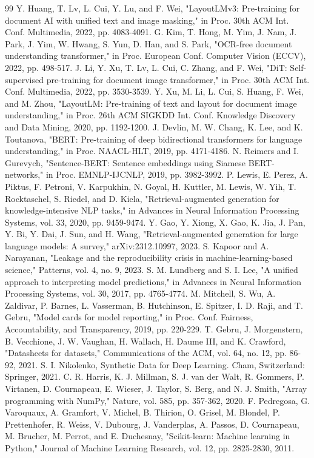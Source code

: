 \documentclass[conference]{IEEEtran}
\begin{document}
\begin{thebibliography}{99}
 Y. Huang, T. Lv, L. Cui, Y. Lu, and F. Wei, "LayoutLMv3: Pre-training for document AI with unified text and image masking," in Proc. 30th ACM Int. Conf. Multimedia, 2022, pp. 4083-4091.
 G. Kim, T. Hong, M. Yim, J. Nam, J. Park, J. Yim, W. Hwang, S. Yun, D. Han, and S. Park, "OCR-free document understanding transformer," in Proc. European Conf. Computer Vision (ECCV), 2022, pp. 498-517.
 J. Li, Y. Xu, T. Lv, L. Cui, C. Zhang, and F. Wei, "DiT: Self-supervised pre-training for document image transformer," in Proc. 30th ACM Int. Conf. Multimedia, 2022, pp. 3530-3539.
 Y. Xu, M. Li, L. Cui, S. Huang, F. Wei, and M. Zhou, "LayoutLM: Pre-training of text and layout for document image understanding," in Proc. 26th ACM SIGKDD Int. Conf. Knowledge Discovery and Data Mining, 2020, pp. 1192-1200.
 J. Devlin, M. W. Chang, K. Lee, and K. Toutanova, "BERT: Pre-training of deep bidirectional transformers for language understanding," in Proc. NAACL-HLT, 2019, pp. 4171-4186.
 N. Reimers and I. Gurevych, "Sentence-BERT: Sentence embeddings using Siamese BERT-networks," in Proc. EMNLP-IJCNLP, 2019, pp. 3982-3992.
 P. Lewis, E. Perez, A. Piktus, F. Petroni, V. Karpukhin, N. Goyal, H. Kuttler, M. Lewis, W. Yih, T. Rocktaschel, S. Riedel, and D. Kiela, "Retrieval-augmented generation for knowledge-intensive NLP tasks," in Advances in Neural Information Processing Systems, vol. 33, 2020, pp. 9459-9474.
 Y. Gao, Y. Xiong, X. Gao, K. Jia, J. Pan, Y. Bi, Y. Dai, J. Sun, and H. Wang, "Retrieval-augmented generation for large language models: A survey," arXiv:2312.10997, 2023.
 S. Kapoor and A. Narayanan, "Leakage and the reproducibility crisis in machine-learning-based science," Patterns, vol. 4, no. 9, 2023.
 S. M. Lundberg and S. I. Lee, "A unified approach to interpreting model predictions," in Advances in Neural Information Processing Systems, vol. 30, 2017, pp. 4765-4774.
 M. Mitchell, S. Wu, A. Zaldivar, P. Barnes, L. Vasserman, B. Hutchinson, E. Spitzer, I. D. Raji, and T. Gebru, "Model cards for model reporting," in Proc. Conf. Fairness, Accountability, and Transparency, 2019, pp. 220-229.
 T. Gebru, J. Morgenstern, B. Vecchione, J. W. Vaughan, H. Wallach, H. Daume III, and K. Crawford, "Datasheets for datasets," Communications of the ACM, vol. 64, no. 12, pp. 86-92, 2021.
 S. I. Nikolenko, Synthetic Data for Deep Learning. Cham, Switzerland: Springer, 2021.
 C. R. Harris, K. J. Millman, S. J. van der Walt, R. Gommers, P. Virtanen, D. Cournapeau, E. Wieser, J. Taylor, S. Berg, and N. J. Smith, "Array programming with NumPy," Nature, vol. 585, pp. 357-362, 2020.
 F. Pedregosa, G. Varoquaux, A. Gramfort, V. Michel, B. Thirion, O. Grisel, M. Blondel, P. Prettenhofer, R. Weiss, V. Dubourg, J. Vanderplas, A. Passos, D. Cournapeau, M. Brucher, M. Perrot, and E. Duchesnay, "Scikit-learn: Machine learning in Python," Journal of Machine Learning Research, vol. 12, pp. 2825-2830, 2011.
\end{thebibliography}
\end{document}
